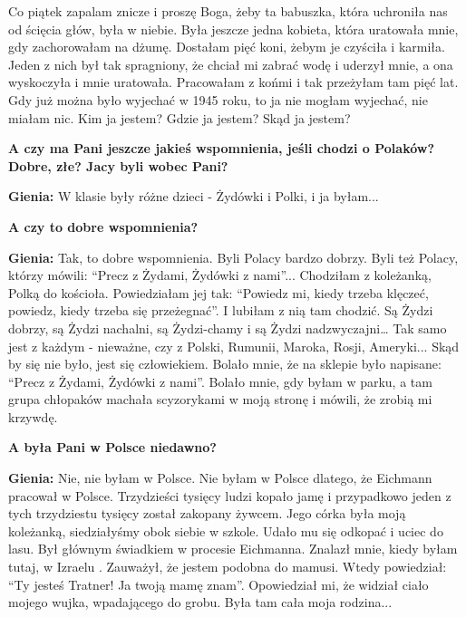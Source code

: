\begin{otherlanguage}{polish}
Co piątek zapalam znicze i proszę Boga, żeby ta babuszka, która uchroniła nas od ścięcia głów, była w niebie. Była jeszcze jedna kobieta, która uratowała mnie, gdy zachorowałam na dżumę. Dostałam pięć koni, żebym je czyściła i karmiła. Jeden z nich był tak spragniony, że chciał mi zabrać wodę i uderzył mnie, a ona wyskoczyła i mnie uratowała. Pracowałam z końmi i tak przeżyłam tam pięć lat. Gdy już można było wyjechać w 1945 roku, to ja nie mogłam wyjechać, nie miałam nic. Kim ja jestem? Gdzie ja jestem? Skąd ja jestem?

\textbf{A czy ma Pani jeszcze jakieś wspomnienia, jeśli chodzi o Polaków? Dobre, złe? Jacy byli wobec Pani?}

\textbf{Gienia:} W klasie były różne dzieci - Żydówki i Polki, i ja byłam...

\textbf{A czy to dobre wspomnienia?}

\textbf{Gienia:} Tak, to dobre wspomnienia. Byli Polacy bardzo dobrzy. Byli też Polacy, którzy mówili: "`Precz z Żydami, Żydówki z nami"'... Chodziłam z koleżanką, Polką do kościoła. Powiedziałam jej tak: "`Powiedz mi, kiedy trzeba klęczeć, powiedz, kiedy trzeba się przeżegnać"'. I lubiłam z nią tam chodzić. Są Żydzi dobrzy, są Żydzi nachalni, są Żydzi-chamy i są Żydzi nadzwyczajni… Tak samo jest z każdym - nieważne, czy z Polski, Rumunii, Maroka, Rosji, Ameryki... Skąd by się nie było, jest się człowiekiem. Bolało mnie, że na sklepie było napisane: "`Precz z Żydami, Żydówki z nami"'. Bolało mnie, gdy byłam w parku, a tam grupa chłopaków machała scyzorykami w moją stronę i mówili, że zrobią mi krzywdę.

\textbf{A była Pani w Polsce niedawno?}

\textbf{Gienia:} Nie, nie byłam w Polsce. Nie byłam w Polsce dlatego, że Eichmann pracował w Polsce. Trzydzieści tysięcy ludzi kopało jamę i przypadkowo jeden z tych trzydziestu tysięcy został zakopany żywcem. Jego córka była moją koleżanką, siedziałyśmy obok siebie w szkole. Udało mu się odkopać i uciec do lasu. Był głównym świadkiem w procesie Eichmanna. Znalazł mnie, kiedy byłam tutaj, w Izraelu . Zauważył, że jestem podobna do mamusi. Wtedy powiedział: "`Ty jesteś Tratner! Ja twoją mamę znam"'. Opowiedział mi, że widział ciało mojego wujka, wpadającego do grobu. Była tam cała moja rodzina...
\end{otherlanguage}